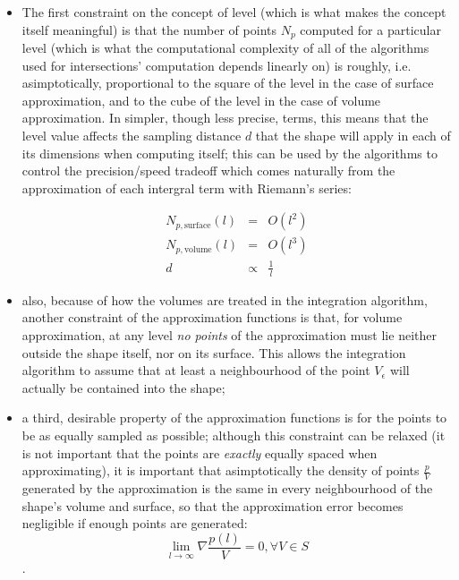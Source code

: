 \begin{itemize}
  \item{The first constraint on the  concept of level
      (which is what makes the concept itself meaningful) is that the number of points
      $N_p$
      computed for a particular level (which is what the computational complexity of
      all of the algorithms used for intersections' computation depends linearly on)
      is roughly, i.e. asimptotically, proportional to the square of the level in the
      case of surface approximation, and to the cube of the level in the case of
      volume approximation. In simpler, though less precise, terms, this means that
      the level value affects the sampling distance $d$ that the shape will apply in each
      of its dimensions when computing itself; this can be used by the algorithms to
      control the precision/speed tradeoff which comes naturally from the
      approximation of each intergral term with Riemann's series:

      \begin{eqnarray}
        N_{p,\text{surface}}(l)& = & O(l^2) \\
        N_{p,\text{volume}}(l) & = & O(l^3) \label{volume-l-3}\\
        d & \propto & \frac{1}{l}
      \end{eqnarray}
    }
  \item{also, because of how the volumes are treated in the integration
      algorithm, another constraint of the approximation functions is that, for
      volume approximation, at any level \emph{no points} of the approximation
      must lie neither outside the shape itself, nor on its surface. This allows the
      integration algorithm to assume that at least a neighbourhood of the point
    $V_{\epsilon}$ will actually be contained into the shape;}
  \item{a third, desirable property of the approximation functions is for the
      points to be as equally sampled as possible; although this constraint can be
      relaxed (it is not important that the points are \emph{exactly} equally
      spaced when approximating), it is important
      that asimptotically the density of points $\frac{p}{V}$ generated by the approximation
      is the same in every neighbourhood of the shape's volume and surface, so
      that the approximation error becomes negligible if enough points are
      generated:
      \begin{equation} \label{eqn:points_with_constant_density}
        \lim_{l \rightarrow \infty} \nabla \frac{p(l)}{V} = 0, \forall V
        \in S
    \end{equation}.
  }
\end{itemize}

